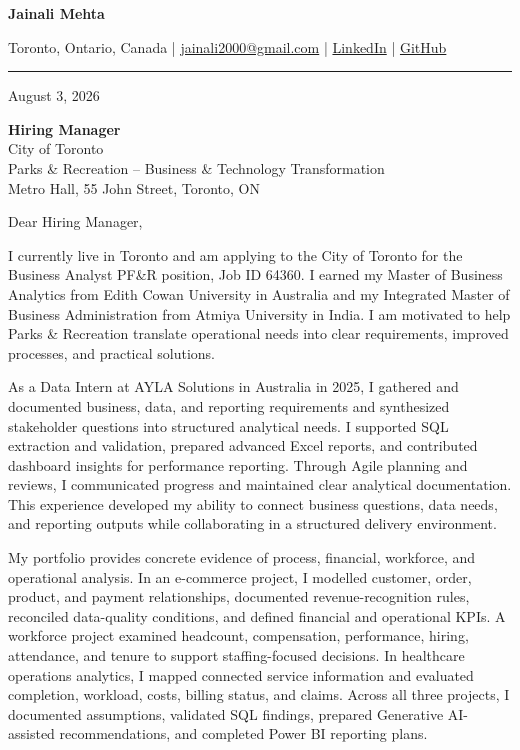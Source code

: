 \documentclass[letterpaper,10pt]{article}
\begin{document}
\begin{center}
  {\fontsize{17}{19}\selectfont\textbf{Jainali Mehta}}\par\vspace{2pt}
  \small Toronto, Ontario, Canada \;|\;
  \href{mailto:jainali2000@gmail.com}{jainali2000@gmail.com} \;|\;
  \href{https://www.linkedin.com/in/jainali-mehta}{LinkedIn} \;|\;
  \href{https://github.com/jainalimehta}{GitHub}
\end{center}
\vspace{-5pt}
\noindent\rule{\textwidth}{0.4pt}

August 3, 2026

\textbf{Hiring Manager}\\
City of Toronto\\
Parks \& Recreation -- Business \& Technology Transformation\\
Metro Hall, 55 John Street, Toronto, ON

Dear Hiring Manager,

I currently live in Toronto and am applying to the City of Toronto for the Business Analyst PF\&R position, Job ID 64360. I earned my Master of Business Analytics from Edith Cowan University in Australia and my Integrated Master of Business Administration from Atmiya University in India. I am motivated to help Parks \& Recreation translate operational needs into clear requirements, improved processes, and practical solutions.

As a Data Intern at AYLA Solutions in Australia in 2025, I gathered and documented business, data, and reporting requirements and synthesized stakeholder questions into structured analytical needs. I supported SQL extraction and validation, prepared advanced Excel reports, and contributed dashboard insights for performance reporting. Through Agile planning and reviews, I communicated progress and maintained clear analytical documentation. This experience developed my ability to connect business questions, data needs, and reporting outputs while collaborating in a structured delivery environment.

My portfolio provides concrete evidence of process, financial, workforce, and operational analysis. In an e-commerce project, I modelled customer, order, product, and payment relationships, documented revenue-recognition rules, reconciled data-quality conditions, and defined financial and operational KPIs. A workforce project examined headcount, compensation, performance, hiring, attendance, and tenure to support staffing-focused decisions. In healthcare operations analytics, I mapped connected service information and evaluated completion, workload, costs, billing status, and claims. Across all three projects, I documented assumptions, validated SQL findings, prepared Generative AI-assisted recommendations, and completed Power BI reporting plans.
\end{document}
